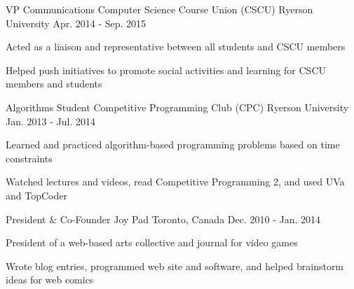 \begin{cventries}
  \cventry
    {VP Communications}
    {Computer Science Course Union (CSCU)}
    {Ryerson University}
    {Apr. 2014 - Sep. 2015}
    {
      \begin{cvitems}
        \item {Acted as a liaison and representative between all students and CSCU members}
         \item {Helped push initiatives to promote social activities and learning for CSCU members and students}
      \end{cvitems}
      }
   \cventry
    {Algorithms Student}
    {Competitive Programming Club (CPC)}
    {Ryerson University}
    {Jan. 2013 - Jul. 2014}
    {
      \begin{cvitems}
        \item {Learned and practiced algorithm-based programming problems based on time constraints}
        \item {Watched lectures and videos, read Competitive Programming 2, and used UVa and TopCoder}
      \end{cvitems}
    }
   \cventry
    {President \& Co-Founder}
    {Joy Pad}
    {Toronto, Canada}
    {Dec. 2010 - Jan. 2014}
    {
      \begin{cvitems}
        \item {President of a web-based arts collective and journal for video games}
        \item {Wrote blog entries, programmed web site and software, and helped brainstorm ideas for web comics}
      \end{cvitems}
    }
\end{cventries}
